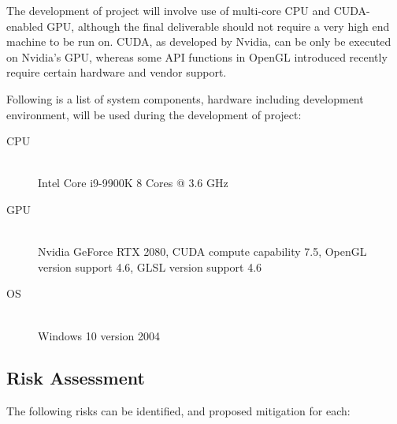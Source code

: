 \documentclass[oneside, a4paper]{article}
\begin{document}
    The development of project will involve use of multi-core CPU and CUDA-enabled GPU, although the final deliverable should not require a very high end machine to be run on. CUDA, as developed by Nvidia, can be only be executed on Nvidia's GPU, whereas some API functions in OpenGL introduced recently require certain hardware and vendor support.

    Following is a list of system components, hardware including development environment, will be used during the development of project:

    \begin{description}
        \item[CPU] \hfill \\
            Intel Core i9-9900K 8 Cores @ 3.6 GHz
        \item[GPU] \hfill \\
            Nvidia GeForce RTX 2080, CUDA compute capability 7.5, OpenGL version support 4.6, GLSL version support 4.6
        \item[OS] \hfill \\
            Windows 10 version 2004
    \end{description}

    \subsection{Risk Assessment}

    The following risks can be identified, and proposed mitigation for each:
\end{document}
